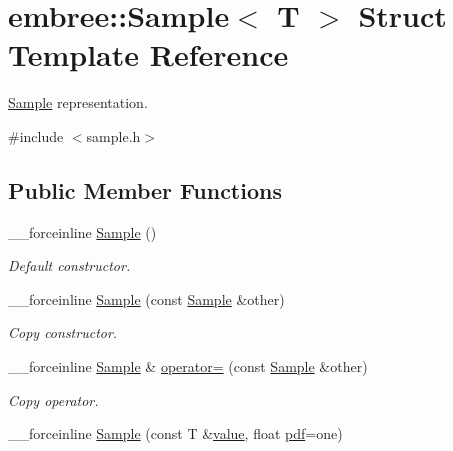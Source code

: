 \hypertarget{structembree_1_1_sample}{
\section{embree::Sample$<$ T $>$ Struct Template Reference}
\label{structembree_1_1_sample}
}


\hyperlink{structembree_1_1_sample}{Sample} representation.  




{\ttfamily \#include $<$sample.h$>$}

\subsection*{Public Member Functions}
\begin{DoxyCompactItemize}
\item 
\hypertarget{structembree_1_1_sample_a1e8d28c3df8ccffb665c25018c52b782}{
\_\-\_\-forceinline \hyperlink{structembree_1_1_sample_a1e8d28c3df8ccffb665c25018c52b782}{Sample} ()}
\label{structembree_1_1_sample_a1e8d28c3df8ccffb665c25018c52b782}

\begin{DoxyCompactList}\small\item\em Default constructor. \item\end{DoxyCompactList}\item 
\hypertarget{structembree_1_1_sample_a99042b4f5c43546ec1454e68e6724cbe}{
\_\-\_\-forceinline \hyperlink{structembree_1_1_sample_a99042b4f5c43546ec1454e68e6724cbe}{Sample} (const \hyperlink{structembree_1_1_sample}{Sample} \&other)}
\label{structembree_1_1_sample_a99042b4f5c43546ec1454e68e6724cbe}

\begin{DoxyCompactList}\small\item\em Copy constructor. \item\end{DoxyCompactList}\item 
\hypertarget{structembree_1_1_sample_a734585271eb22376ed23658f7ae3e16a}{
\_\-\_\-forceinline \hyperlink{structembree_1_1_sample}{Sample} \& \hyperlink{structembree_1_1_sample_a734585271eb22376ed23658f7ae3e16a}{operator=} (const \hyperlink{structembree_1_1_sample}{Sample} \&other)}
\label{structembree_1_1_sample_a734585271eb22376ed23658f7ae3e16a}

\begin{DoxyCompactList}\small\item\em Copy operator. \item\end{DoxyCompactList}\item 
\hypertarget{structembree_1_1_sample_a3a704553967d013fbc126ef8856a501e}{
\_\-\_\-forceinline \hyperlink{structembree_1_1_sample_a3a704553967d013fbc126ef8856a501e}{Sample} (const T \&\hyperlink{structembree_1_1_sample_a472517083f9479b3fc23f8cbb33ff514}{value}, float \hyperlink{structembree_1_1_sample_a67436809923a412a9a244f94f73b148a}{pdf}=one)}
\label{structembree_1_1_sample_a3a704553967d013fbc126ef8856a501e}


\end{DoxyCompactItemize}
